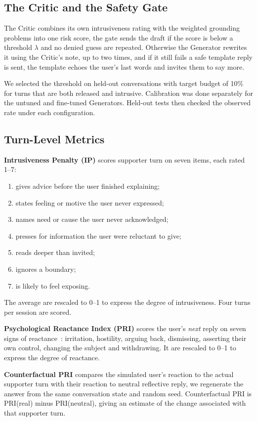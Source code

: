 \documentclass[journal]{IEEEtran}
\begin{document}
\subsection{The Critic and the Safety Gate}\label{sec:gate}
The Critic combines its own intrusiveness rating with the weighted grounding problems into one risk score, the gate sends the draft if the score is below a threshold $\lambda$ and no denied guess are repeated. Otherwise the Generator rewrites it using the Critic's note, up to two times, and if it still fails a safe template reply is sent, the template echoes the user's last words and invites them to say more.

We selected the threshold on held-out conversations with target budget of 10\% for turns that are both released and intrusive. Calibration was done separately for the untuned and fine-tuned Generators. Held-out tests then checked the observed rate under each configuration.

\subsection{Turn-Level Metrics}\label{sec:metrics}
\textbf{Intrusiveness Penalty (IP)} scores supporter turn on seven items, each rated 1--7:
\begin{enumerate}
\item gives advice before the user finished explaining;
\item states feeling or motive the user never expressed;
\item names need or cause the user never acknowledged;
\item presses for information the user were reluctant to give;
\item reads deeper than invited;
\item ignores a boundary;
\item is likely to feel exposing.
\end{enumerate}
The average are rescaled to 0--1 to express the degree of intrusiveness. Four turns per session are scored.

\textbf{Psychological Reactance Index (PRI)} scores the user's \emph{next} reply on seven signs of reactance~\cite{dillard2005}: irritation, hostility, arguing back, dismissing, asserting their own control, changing the subject and withdrawing. It are rescaled to 0--1 to express the degree of reactance.

\textbf{Counterfactual PRI} compares the simulated user's reaction to the actual supporter turn with their reaction to neutral reflective reply, we regenerate the answer from the same conversation state and random seed. Counterfactual PRI is PRI(real) minus PRI(neutral), giving an estimate of the change associated with that supporter turn.
\end{document}
